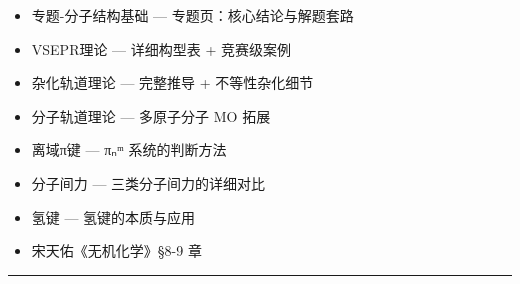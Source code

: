 \documentclass[a4paper,11pt]{ctexart}
\providecommand{\tightlist}{\setlength{\itemsep}{0pt}\setlength{\parskip}{0pt}}
\begin{document}
\begin{itemize}
\tightlist
\item
  专题-分子结构基础 --- 专题页：核心结论与解题套路
\item
  VSEPR理论 --- 详细构型表 + 竞赛级案例
\item
  杂化轨道理论 --- 完整推导 + 不等性杂化细节
\item
  分子轨道理论 --- 多原子分子 MO 拓展
\item
  离域π键 --- πₙᵐ 系统的判断方法
\item
  分子间力 --- 三类分子间力的详细对比
\item
  氢键 --- 氢键的本质与应用
\item
  宋天佑《无机化学》§8-9 章
\end{itemize}

\begin{center}\rule{0.5\linewidth}{0.5pt}\end{center}
\end{document}
